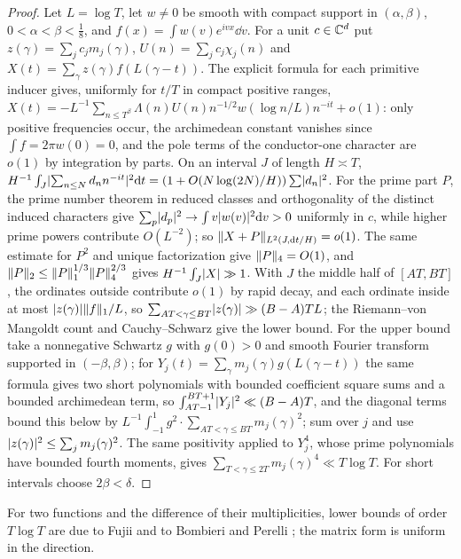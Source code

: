 \begin{proof}
Let $L=\log T$, let $w\ne0$ be smooth with compact support in $(\alpha,\beta)$, $0<\alpha<\beta<\tfrac18$, and
$f(x)=\int w(v)e^{ivx}\dd v$. For a unit $c\in\mathbb{C}^d$ put $z(\gamma)=\sum_jc_jm_j(\gamma)$,
$U(n)=\sum_jc_j\chi_j(n)$ and $X(t)=\sum_\gamma z(\gamma)f(L(\gamma-t))$. The explicit formula
\cite[Lemma~2.1]{LiuYe2005Distribution} for each primitive inducer gives, uniformly for $t/T$ in compact
positive ranges,
$X(t)=-L^{-1}\sum_{n\le T^\beta}\Lambda(n)U(n)n^{-1/2}w(\log n/L)n^{-it}+o(1)$: only positive frequencies
occur, the archimedean constant vanishes since $\int f=2\pi w(0)=0$, and the pole terms of the
conductor-one character are $o(1)$ by integration by parts. On an interval $J$ of length $H\asymp T$,
$H^{-1}\int_J\lvert\sum_{n\le N}d_nn^{-it}\rvert^2\mathrm{d} t=(1+O(N\log(2N)/H))\sum\lvert d_n\rvert^2$. For the prime part $P$,
the prime number theorem in reduced classes and orthogonality of the distinct induced characters give
$\sum_p\lvert d_p\rvert^2\to\int v\lvert w(v)\rvert^2\mathrm{d} v>0$ uniformly in $c$, while higher prime powers contribute
$O(L^{-2})$; so $\lVert X+P\rVert_{L^2(J,\mathrm{d} t/H)}=o(1)$. The same estimate for $P^2$ and unique factorization
give $\lVert P\rVert_4=O(1)$, and $\lVert P\rVert_2\le\lVert P\rVert_1^{1/3}\lVert P\rVert_4^{2/3}$ gives $H^{-1}\int_J\lvert X\rvert\gg1$. With $J$
the middle half of $[AT,BT]$, the ordinates outside contribute $o(1)$ by rapid decay, and each ordinate
inside at most $\lvert z(\gamma)\rvert\lVert f\rVert_1/L$, so $\sum_{AT<\gamma\le BT}\lvert z(\gamma)\rvert\gg(B-A)TL$; the
Riemann--von Mangoldt count and Cauchy--Schwarz give the lower bound. For the upper bound take a
nonnegative Schwartz $g$ with $g(0)>0$ and smooth Fourier transform supported in $(-\beta,\beta)$; for
$Y_j(t)=\sum_\gamma m_j(\gamma)g(L(\gamma-t))$ the same formula gives two short polynomials with bounded
coefficient square sums and a bounded archimedean term, so $\int_{AT-1}^{BT+1}\lvert Y_j\rvert^2\ll(B-A)T$, and the
diagonal terms bound this below by $L^{-1}\int_{-1}^1g^2\cdot\sum_{AT<\gamma\le BT}m_j(\gamma)^2$; sum over $j$ and use
$\lvert z(\gamma)\rvert^2\le\sum_jm_j(\gamma)^2$. The same positivity applied to $Y_j^4$, whose prime polynomials have
bounded fourth moments, gives $\sum_{T<\gamma\le2T}m_j(\gamma)^4\ll T\log T$. For short intervals choose
$2\beta<\delta$.
\end{proof}

For two functions and the difference of their multiplicities, lower bounds of order $T\log T$ are due
to Fujii and to Bombieri and Perelli \cite{Fujii1976Zeros,BombieriPerelli1998Distinct}; the matrix form
is uniform in the direction.

